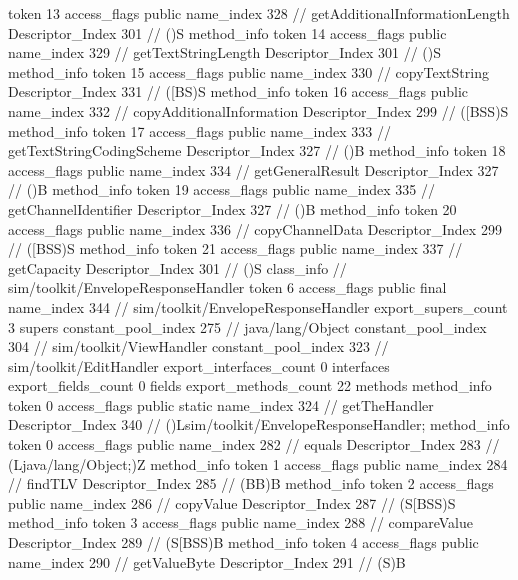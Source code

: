 {{{{{					token	13
					access_flags	public
					name_index	328		// getAdditionalInformationLength
					Descriptor_Index	301		// ()S
				}
				method_info {
					token	14
					access_flags	public
					name_index	329		// getTextStringLength
					Descriptor_Index	301		// ()S
				}
				method_info {
					token	15
					access_flags	public
					name_index	330		// copyTextString
					Descriptor_Index	331		// ([BS)S
				}
				method_info {
					token	16
					access_flags	public
					name_index	332		// copyAdditionalInformation
					Descriptor_Index	299		// ([BSS)S
				}
				method_info {
					token	17
					access_flags	public
					name_index	333		// getTextStringCodingScheme
					Descriptor_Index	327		// ()B
				}
				method_info {
					token	18
					access_flags	public
					name_index	334		// getGeneralResult
					Descriptor_Index	327		// ()B
				}
				method_info {
					token	19
					access_flags	public
					name_index	335		// getChannelIdentifier
					Descriptor_Index	327		// ()B
				}
				method_info {
					token	20
					access_flags	public
					name_index	336		// copyChannelData
					Descriptor_Index	299		// ([BSS)S
				}
				method_info {
					token	21
					access_flags	public
					name_index	337		// getCapacity
					Descriptor_Index	301		// ()S
				}
			}
		}
		class_info {		// sim/toolkit/EnvelopeResponseHandler
			token	6
			access_flags	public final
			name_index	344		// sim/toolkit/EnvelopeResponseHandler
			export_supers_count	3
			supers {
				constant_pool_index	275		// java/lang/Object
				constant_pool_index	304		// sim/toolkit/ViewHandler
				constant_pool_index	323		// sim/toolkit/EditHandler
			}
			export_interfaces_count	0
			interfaces {
			}
			export_fields_count	0
			fields {
			}
			export_methods_count	22
			methods {
				method_info {
					token	0
					access_flags	public static
					name_index	324		// getTheHandler
					Descriptor_Index	340		// ()Lsim/toolkit/EnvelopeResponseHandler;
				}
				method_info {
					token	0
					access_flags	public
					name_index	282		// equals
					Descriptor_Index	283		// (Ljava/lang/Object;)Z
				}
				method_info {
					token	1
					access_flags	public
					name_index	284		// findTLV
					Descriptor_Index	285		// (BB)B
				}
				method_info {
					token	2
					access_flags	public
					name_index	286		// copyValue
					Descriptor_Index	287		// (S[BSS)S
				}
				method_info {
					token	3
					access_flags	public
					name_index	288		// compareValue
					Descriptor_Index	289		// (S[BSS)B
				}
				method_info {
					token	4
					access_flags	public
					name_index	290		// getValueByte
					Descriptor_Index	291		// (S)B
}}}}}
